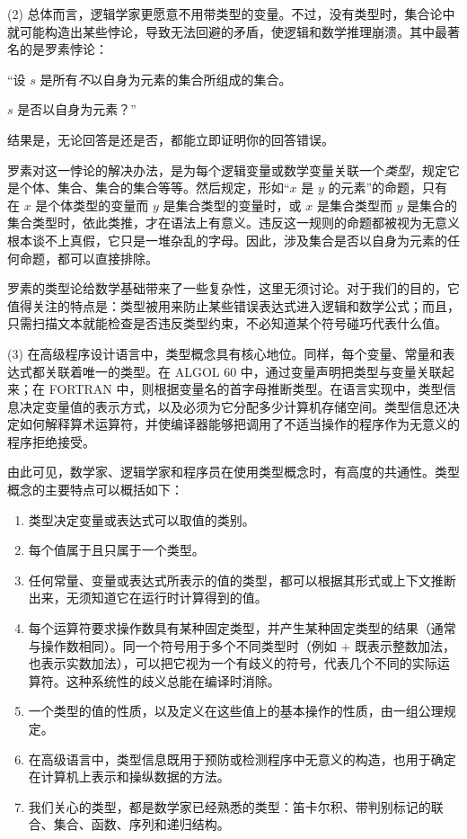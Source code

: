 \documentclass[twoside,11pt,fontset=none]{ctexbook}
\begin{document}
(2) 总体而言，逻辑学家更愿意不用带类型的变量。不过，没有类型时，集合论中就可能构造出某些悖论，导致无法回避的矛盾，使逻辑和数学推理崩溃。其中最著名的是罗素悖论：

\quad \hspace{-.4em}“设 $s$ 是所有\textit{不}以自身为元素的集合所组成的集合。

\quad $s$ 是否以自身为元素？”

\noindent
结果是，无论回答是还是否，都能立即证明你的回答错误。

罗素对这一悖论的解决办法，是为每个逻辑变量或数学变量关联一个\textit{类型}，规定它是个体、集合、集合的集合等等。然后规定，形如“$x$ 是 $y$ 的元素”的命题，只有在 $x$ 是个体类型的变量而 $y$ 是集合类型的变量时，或 $x$ 是集合类型而 $y$ 是集合的集合类型时，依此类推，才在语法上有意义。违反这一规则的命题都被视为无意义\textemdash{}根本谈不上真假，它只是一堆杂乱的字母。因此，涉及集合是否以自身为元素的任何命题，都可以直接排除。

罗素的类型论给数学基础带来了一些复杂性，这里无须讨论。对于我们的目的，它值得关注的特点是：类型被用来防止某些错误表达式进入逻辑和数学公式；而且，只需扫描文本就能检查是否违反类型约束，不必知道某个符号碰巧代表什么值。

(3) 在高级程序设计语言中，类型概念具有核心地位。同样，每个变量、常量和表达式都关联着唯一的类型。在 ALGOL 60 中，通过变量声明把类型与变量关联起来；在 FORTRAN 中，则根据变量名的首字母推断类型。在语言实现中，类型信息决定变量值的表示方式，以及必须为它分配多少计算机存储空间。类型信息还决定如何解释算术运算符，并使编译器能够把调用了不适当操作的程序作为无意义的程序拒绝接受。

由此可见，数学家、逻辑学家和程序员在使用类型概念时，有高度的共通性。类型概念的主要特点可以概括如下：

\begin{enumerate}[wide, nosep, label=(\arabic*)]
	\item 类型决定变量或表达式可以取值的类别。
	\item 每个值属于且只属于一个类型。
	\item 任何常量、变量或表达式所表示的值的类型，都可以根据其形式或上下文推断出来，无须知道它在运行时计算得到的值。
	\item 每个运算符要求操作数具有某种固定类型，并产生某种固定类型的结果（通常与操作数相同）。同一个符号用于多个不同类型时（例如 $+$ 既表示整数加法，也表示实数加法），可以把它视为一个有歧义的符号，代表几个不同的实际运算符。这种系统性的歧义总能在编译时消除。
	\item 一个类型的值的性质，以及定义在这些值上的基本操作的性质，由一组公理规定。
	\item 在高级语言中，类型信息既用于预防或检测程序中无意义的构造，也用于确定在计算机上表示和操纵数据的方法。
	\item 我们关心的类型，都是数学家已经熟悉的类型：笛卡尔积、带判别标记的联合、集合、函数、序列和递归结构。
\end{enumerate}
\end{document}
